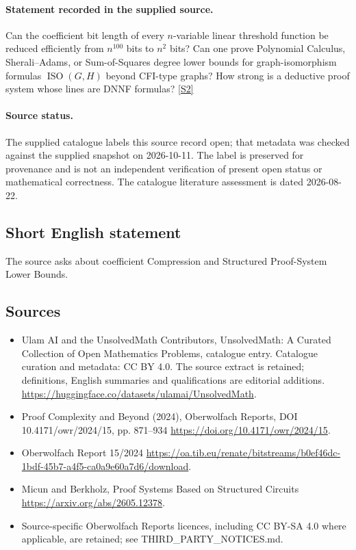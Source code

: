 \documentclass[11pt]{article}
\begin{document}
\paragraph{Statement recorded in the supplied source.}
Can the coefficient bit length of every $n$-variable linear threshold function be reduced efficiently from $n^{100}$ bits to $n^2$ bits? Can one prove Polynomial Calculus, Sherali–Adams, or Sum-of-Squares degree lower bounds for graph-isomorphism formulas $\operatorname{ISO}(G,H)$ beyond CFI-type graphs? How strong is a deductive proof system whose lines are DNNF formulas? \href{https://doi.org/10.4171/owr/2024/15}{[S2]}
\paragraph{Source status.}
The supplied catalogue labels this source record open; that metadata was checked against the supplied snapshot on 2026-10-11. The label is preserved for provenance and is not an independent verification of present open status or mathematical correctness. The catalogue literature assessment is dated 2026-08-22.
\subsection{Short English statement}
The source asks about coefficient Compression and Structured Proof-System Lower Bounds.
\subsection{Sources}
\begin{itemize}
\item[S1] Ulam AI and the UnsolvedMath Contributors, UnsolvedMath: A Curated Collection of Open Mathematics Problems, catalogue entry. Catalogue curation and metadata: CC BY 4.0. The source extract is retained; definitions, English summaries and qualifications are editorial additions.
\url{https://huggingface.co/datasets/ulamai/UnsolvedMath}.
\item[S2] Proof Complexity and Beyond (2024), Oberwolfach Reports, DOI 10.4171/owr/2024/15, pp. 871--934
\url{https://doi.org/10.4171/owr/2024/15}.
\item[S3] Oberwolfach Report 15/2024
\url{https://oa.tib.eu/renate/bitstreams/b0ef46dc-1bdf-45b7-a4f5-ca0a9e60a7d6/download}.
\item[S4] Micun and Berkholz, Proof Systems Based on Structured Circuits
\url{https://arxiv.org/abs/2605.12378}.
\item Source-specific Oberwolfach Reports licences, including CC BY-SA 4.0 where applicable, are retained; see THIRD\_PARTY\_NOTICES.md.
\end{itemize}
\end{document}
